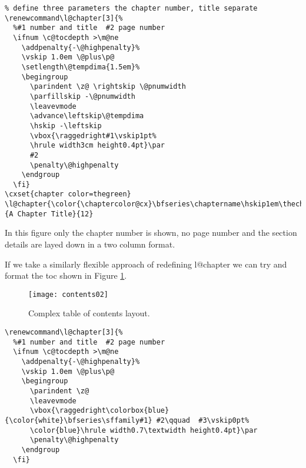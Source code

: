 \begin{lstlisting}
% define three parameters the chapter number, title separate
\renewcommand\l@chapter[3]{%
  %#1 number and title  #2 page number
  \ifnum \c@tocdepth >\m@ne
    \addpenalty{-\@highpenalty}%
    \vskip 1.0em \@plus\p@
    \setlength\@tempdima{1.5em}%
    \begingroup
      \parindent \z@ \rightskip \@pnumwidth
      \parfillskip -\@pnumwidth
      \leavevmode
      \advance\leftskip\@tempdima
      \hskip -\leftskip
      \vbox{\raggedright#1\vskip1pt%
      \hrule width3cm height0.4pt}\par
      #2
      \penalty\@highpenalty
    \endgroup
  \fi}
\cxset{chapter color=thegreen}
\l@chapter{\color{\chaptercolor@cx}\bfseries\chaptername\hskip1em\thechapter}{A Chapter Title}{12}
\end{lstlisting}


In this figure only the chapter number is shown, no page number and the section details are layed down in a two column format.


If we take a similarly flexible approach of redefining l@chapter we can try and format the toc shown in Figure \ref{fig:tocsteward}.

\begin{figure}[tp]
\texttt{[image: contents02]}
\caption{Complex table of contents layout.}
\label{fig:tocsteward}
\end{figure}



\begin{lstlisting}
\renewcommand\l@chapter[3]{%
  %#1 number and title  #2 page number
  \ifnum \c@tocdepth >\m@ne
    \addpenalty{-\@highpenalty}%
    \vskip 1.0em \@plus\p@
    \begingroup
      \parindent \z@
      \leavevmode
      \vbox{\raggedright\colorbox{blue}{\color{white}\bfseries\sffamily#1} #2\qquad  #3\vskip0pt%
      \color{blue}\hrule width0.7\textwidth height0.4pt}\par
      \penalty\@highpenalty
    \endgroup
  \fi}
\end{lstlisting}


